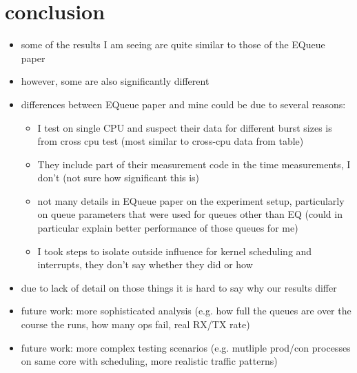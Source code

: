 \section{conclusion}
\begin{itemize}
    \item some of the results I am seeing are quite similar to those of the EQueue paper
    \item however, some are also significantly different
    \item differences between EQueue paper and mine could be due to several reasons:
        \begin{itemize}
            \item I test on single CPU and suspect their data for different burst sizes is from cross cpu test (most similar to cross-cpu data from table)
            \item They include part of their measurement code in the time measurements, I don't (not sure how significant this is)
            \item not many details in EQueue paper on the experiment setup, particularly on queue parameters that were used for queues other than EQ (could in particular explain better performance of those queues for me)
            \item I took steps to isolate outside influence for kernel scheduling and interrupts, they don't say whether they did or how
        \end{itemize}
    \item due to lack of detail on those things it is hard to say why our results differ
    \item future work: more sophisticated analysis (e.g. how full the queues are over the course the runs, how many ops fail, real RX/TX rate)
    \item future work: more complex testing scenarios (e.g. mutliple prod/con processes on same core with scheduling, more realistic traffic patterns)
\end{itemize}
